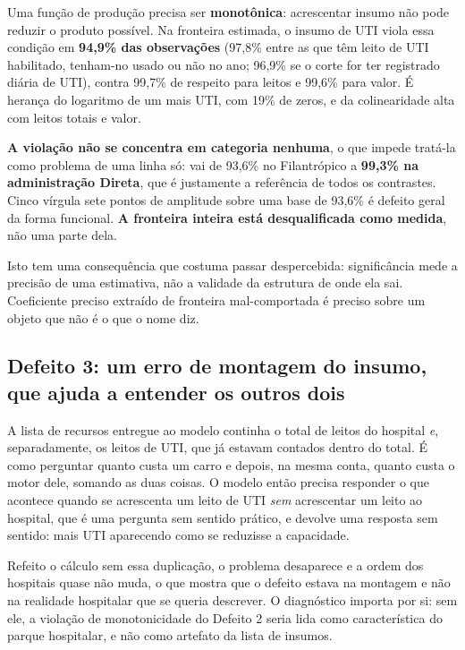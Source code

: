 Uma função de produção precisa ser \textbf{monotônica}: acrescentar
insumo não pode reduzir o produto possível. Na fronteira estimada, o
insumo de UTI viola essa condição em \textbf{94,9\% das observações}
(97,8\% entre as que têm leito de UTI habilitado, tenham-no usado ou não
no ano; 96,9\% se o corte for ter registrado diária de UTI), contra
99,7\% de respeito para leitos e 99,6\% para valor. É herança do
logaritmo de um mais UTI, com 19\% de zeros, e da colinearidade alta com
leitos totais e valor.

\textbf{A violação não se concentra em categoria nenhuma}, o que impede
tratá-la como problema de uma linha só: vai de 93,6\% no Filantrópico a
\textbf{99,3\% na administração Direta}, que é justamente a referência de
todos os contrastes. Cinco vírgula sete pontos de amplitude sobre uma
base de 93,6\% é defeito geral da forma funcional. \textbf{A fronteira
inteira está desqualificada como medida}, não uma parte dela.

Isto tem uma consequência que costuma passar despercebida:
significância mede a precisão de uma estimativa, não a validade da
estrutura de onde ela sai. Coeficiente preciso extraído de fronteira
mal-comportada é preciso sobre um objeto que não é o que o nome diz.

\subsection*{Defeito 3: um erro de montagem do insumo, que ajuda a
entender os outros dois}

A lista de recursos entregue ao modelo continha o total de leitos do
hospital \emph{e}, separadamente, os leitos de UTI, que já estavam
contados dentro do total. É como perguntar quanto custa um carro e
depois, na mesma conta, quanto custa o motor dele, somando as duas
coisas. O modelo então precisa responder o que acontece quando se
acrescenta um leito de UTI \emph{sem} acrescentar um leito ao hospital,
que é uma pergunta sem sentido prático, e devolve uma resposta sem
sentido: mais UTI aparecendo como se reduzisse a capacidade.

Refeito o cálculo sem essa duplicação, o problema desaparece e a ordem
dos hospitais quase não muda, o que mostra que o defeito estava na
montagem e não na realidade hospitalar que se queria descrever. O
diagnóstico importa por si: sem ele, a violação de monotonicidade do
Defeito 2 seria lida como característica do parque hospitalar, e não
como artefato da lista de insumos.

